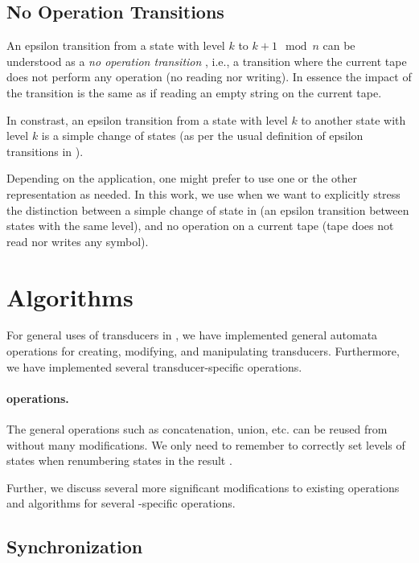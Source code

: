 \subsection{No Operation Transitions}
An epsilon transition from a state with level $k$ to $k+1 \mod n$ can be understood as a \emph{no operation transition} \nop, i.e., a transition where the current tape does not perform any operation (no reading nor writing). In essence the impact of the transition is the same as if reading an empty string on the current tape.

In constrast, an epsilon transition from a state with level $k$ to another state with level $k$ is a simple change of states (as per the usual definition of epsilon transitions in \nfas).

Depending on the application, one might prefer to use one or the other representation as needed.
In this work, we use \nop when we want to explicitly stress the distinction between a simple change of state in \nft (an epsilon transition between states with the same level), and no operation on a current tape (tape does not read nor writes any symbol).

\section{Algorithms}
\label{sec:Algorithms}

For general uses of transducers in \mata, we have implemented general automata operations for creating, modifying, and manipulating transducers.
Furthermore, we have implemented several transducer-specific operations.

\paragraph{\nfa operations.}
The general \nfa operations such as concatenation, union, etc. can be reused from \nfa without many modifications.
We only need to remember to correctly set levels of states when renumbering states in the result \nft.

Further, we discuss several more significant modifications to existing operations and algorithms for several \nft-specific operations.

\subsection{Synchronization}

